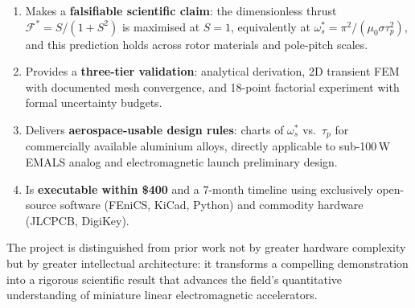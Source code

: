 \documentclass[12pt,letterpaper]{article}
\begin{document}
\begin{enumerate}[noitemsep]
  \item Makes a \textbf{falsifiable scientific claim}: the dimensionless thrust
    $\mathcal{F}^* = S/(1+S^2)$ is maximised at $S = 1$, equivalently at
    $\omega_s^* = \pi^2/(\mu_0\sigma\tau_p^2)$, and this prediction holds across
    rotor materials and pole-pitch scales.
  \item Provides a \textbf{three-tier validation}: analytical derivation, 2D transient
    FEM with documented mesh convergence, and 18-point factorial experiment with
    formal uncertainty budgets.
  \item Delivers \textbf{aerospace-usable design rules}: charts of $\omega_s^*$ vs.\
    $\tau_p$ for commercially available aluminium alloys, directly applicable to
    sub-100\,W EMALS analog and electromagnetic launch preliminary design.
  \item Is \textbf{executable within \$400} and a 7-month timeline using exclusively
    open-source software (FEniCS, KiCad, Python) and commodity hardware (JLCPCB, DigiKey).
\end{enumerate}

The project is distinguished from prior work not by greater hardware complexity but by
greater intellectual architecture: it transforms a compelling demonstration into a
rigorous scientific result that advances the field's quantitative understanding of
miniature linear electromagnetic accelerators.
\end{document}

